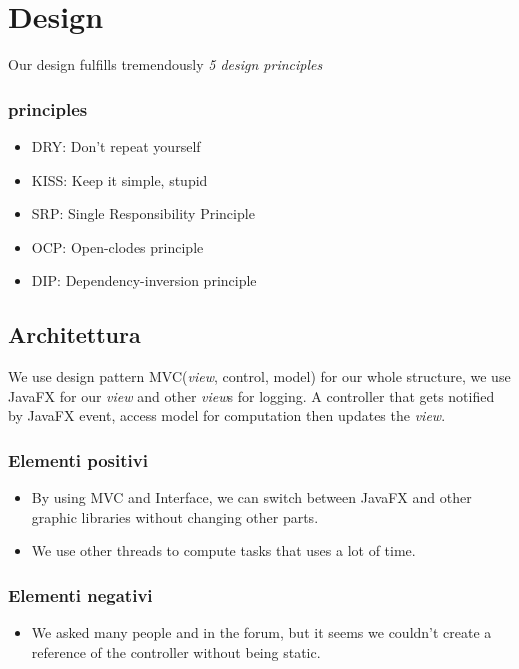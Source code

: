 \documentclass[a4paper,12pt]{report}
\begin{document}
\chapter{Design}
Our design fulfills tremendously \textit{5 design principles}
\subsection*{principles}
\begin{itemize}
	\item DRY: Don’t repeat yourself 
    \item KISS: Keep it simple, stupid 
    \item SRP: Single Responsibility Principle
    \item OCP: Open-clodes principle
    \item DIP: Dependency-inversion principle
\end{itemize}

\section{Architettura}
	We use design pattern MVC(\textit{view}, control, model) for our whole structure, we use JavaFX for our \textit{view} and other \textit{view}s for logging.  
	A controller that gets notified by JavaFX event, access model for computation then updates the \textit{view}.  

\subsection*{Elementi positivi}
\begin{itemize}
	\item By using MVC and Interface, we can switch between JavaFX and other graphic libraries without changing other parts. 
    \item We use other threads to compute tasks that uses a lot of time.
\end{itemize}

\subsection*{Elementi negativi}
\begin{itemize}
	\item We asked many people and in the forum, but it seems we couldn't create a reference of the controller without being static.
\end{itemize}
\end{document}
